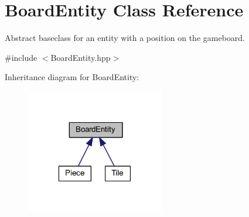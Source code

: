 \hypertarget{class_board_entity}{\section{Board\-Entity Class Reference}
\label{class_board_entity}
}


Abstract baseclass for an entity with a position on the gameboard.  




{\ttfamily \#include $<$Board\-Entity.\-hpp$>$}



Inheritance diagram for Board\-Entity\-:\nopagebreak
\begin{figure}[H]
\begin{center}
\leavevmode
\includegraphics[width=171pt]{class_board_entity__inherit__graph}
\end{center}
\end{figure}
